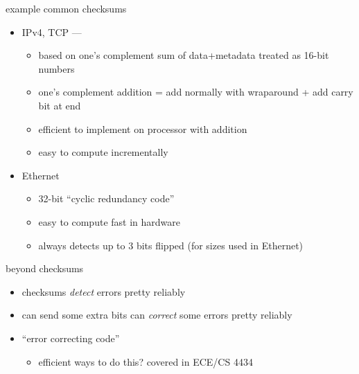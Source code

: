 \begin{frame}[fragile]{example common checksums}
\begin{itemize}
\item IPv4, TCP ---
    \begin{itemize}
    \item based on one's complement sum of data+metadata treated as 16-bit numbers
    \item one's complement addition = add normally with wraparound + add carry bit at end
    \item efficient to implement on processor with addition
    \item easy to compute incrementally
    \end{itemize}
\item Ethernet
    \begin{itemize}
    \item 32-bit ``cyclic redundancy code''
    \item easy to compute fast in hardware
    \item always detects up to 3 bits flipped (for sizes used in Ethernet)
    \end{itemize}
\end{itemize}
\end{frame}

\begin{frame}{beyond checksums}
    \begin{itemize}
    \item checksums \textit{detect} errors pretty reliably
    \vspace{.5cm}
    \item can send some extra bits can \textit{correct} some errors pretty reliably
    \item ``error correcting code''
        \begin{itemize}
        \item efficient ways to do this? covered in ECE/CS 4434
        \end{itemize}
    \end{itemize}
\end{frame}
